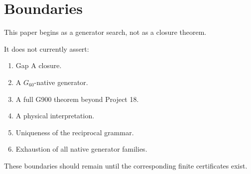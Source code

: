 \section{Boundaries}

This paper begins as a generator search, not as a closure theorem.

It does not currently assert:

\begin{enumerate}[leftmargin=2em]
\item Gap A closure.
\item A \(G_{60}\)-native generator.
\item A full G900 theorem beyond Project 18.
\item A physical interpretation.
\item Uniqueness of the reciprocal grammar.
\item Exhaustion of all native generator families.
\end{enumerate}

These boundaries should remain until the corresponding finite certificates exist.
